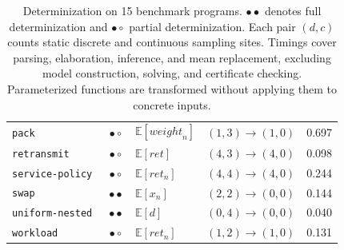 \begin{table}[htbp]
{\begin{tabular}{@{}l c l c c@{}}
        \texttt{pack}~\cite{chakarov2013martingales}
            & $\bullet\!\circ$
            & $\mathbb{E}[\mathit{weight}_n]$
            & $(1,3) \rightarrow (1,0)$
            & 0.697 \\

        \texttt{retransmit}
            & $\bullet\!\circ$
            & $\mathbb{E}[\mathit{ret}]$
            & $(4,3) \rightarrow (4,0)$
            & 0.098 \\

        \texttt{service-policy}
            & $\bullet\!\circ$
            & $\mathbb{E}[\mathit{ret}_n]$
            & $(4,4) \rightarrow (4,0)$
            & 0.244 \\

        \texttt{swap}~\cite{chakarov2014expectation}
            & $\bullet\!\bullet$
            & $\mathbb{E}[x_n]$
            & $(2,2) \rightarrow (0,0)$
            & 0.144 \\

        \texttt{uniform-nested}~\cite{gehr2016psi}
            & $\bullet\!\bullet$
            & $\mathbb{E}[d]$
            & $(0,4) \rightarrow (0,0)$
            & 0.040 \\

        \texttt{workload}
            & $\bullet\!\circ$
            & $\mathbb{E}[\mathit{ret}_n]$
            & $(1,2) \rightarrow (1,0)$
            & 0.131 \\
        \bottomrule
    \end{tabular}%
    }

    \caption{Determinization on 15 benchmark programs.
    $\bullet\!\bullet$ denotes full determinization and $\bullet\!\circ$ partial determinization. Each pair $(d,c)$ counts static discrete and continuous sampling sites. Timings cover parsing, elaboration, inference, and mean replacement, excluding model construction, solving, and certificate checking. Parameterized functions are transformed without applying them to concrete inputs.}
    \label{tab:finite-after-determinization}
\end{table}
